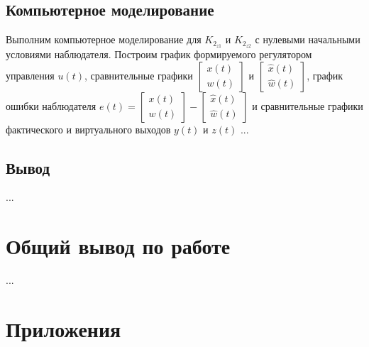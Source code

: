 \documentclass[a4paper, 12pt]{article}
\begin{document}
    \subsection{Компьютерное моделирование}
    Выполним компьютерное моделирование для $K_{2_{z1}}$ и $K_{2_{z2}}$
    с нулевыми начальными условиями наблюдателя. Построим график
    формируемого регулятором управления $u(t)$, сравнительные графики
    $\begin{bmatrix}
        x(t)\\w(t)
    \end{bmatrix}$ и $\begin{bmatrix}
        \hat{x}(t)\\ \hat{w}(t)
    \end{bmatrix}$, график ошибки наблюдателя $e(t)=\begin{bmatrix}
        x(t)\\w(t)
    \end{bmatrix}-\begin{bmatrix}
        \hat{x}(t)\\ \hat{w}(t)
    \end{bmatrix}$ и сравнительные графики фактического и виртуального выходов $y(t)$ и $z(t)$
    ...


    \subsection{Вывод}
    ...


    \section{Общий вывод по работе}
    ...


    \section{Приложения}
\end{document}
